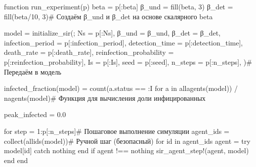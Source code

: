 \documentclass[
  12pt,
  a4paper,
  DIV=11,
  numbers=noendperiod]{scrreprt}
\newenvironment{Shaded}{\begin{snugshade}}{\end{snugshade}}
\newcommand{\CommentTok}[1]{\textcolor[rgb]{0.37,0.37,0.37}{#1}}
\newcommand{\ConstantTok}[1]{\textcolor[rgb]{0.56,0.35,0.01}{#1}}
\newcommand{\ControlFlowTok}[1]{\textcolor[rgb]{0.00,0.23,0.31}{#1}}
\newcommand{\FloatTok}[1]{\textcolor[rgb]{0.68,0.00,0.00}{#1}}
\newcommand{\FunctionTok}[1]{\textcolor[rgb]{0.28,0.35,0.67}{#1}}
\newcommand{\KeywordTok}[1]{\textcolor[rgb]{0.00,0.23,0.31}{#1}}
\newcommand{\NormalTok}[1]{\textcolor[rgb]{0.00,0.23,0.31}{#1}}
\newcommand{\OperatorTok}[1]{\textcolor[rgb]{0.37,0.37,0.37}{#1}}
\begin{document}
\begin{Shaded}
\begin{Highlighting}[]
\KeywordTok{function} \FunctionTok{run\_experiment}\NormalTok{(p)}
\NormalTok{    beta }\OperatorTok{=}\NormalTok{ p[}\OperatorTok{:}\NormalTok{beta]}
\NormalTok{    β\_und }\OperatorTok{=} \FunctionTok{fill}\NormalTok{(beta, }\FloatTok{3}\NormalTok{)}
\NormalTok{    β\_det }\OperatorTok{=} \FunctionTok{fill}\NormalTok{(beta}\OperatorTok{/}\FloatTok{10}\NormalTok{, }\FloatTok{3}\NormalTok{)}\CommentTok{\# Создаём β\_und и β\_det на основе скалярного beta}

\NormalTok{    model }\OperatorTok{=} \FunctionTok{initialize\_sir}\NormalTok{(;}
\NormalTok{        Ns }\OperatorTok{=}\NormalTok{ p[}\OperatorTok{:}\NormalTok{Ns],}
\NormalTok{        β\_und }\OperatorTok{=}\NormalTok{ β\_und,}
\NormalTok{        β\_det }\OperatorTok{=}\NormalTok{ β\_det,}
\NormalTok{        infection\_period }\OperatorTok{=}\NormalTok{ p[}\OperatorTok{:}\NormalTok{infection\_period],}
\NormalTok{        detection\_time }\OperatorTok{=}\NormalTok{ p[}\OperatorTok{:}\NormalTok{detection\_time],}
\NormalTok{        death\_rate }\OperatorTok{=}\NormalTok{ p[}\OperatorTok{:}\NormalTok{death\_rate],}
\NormalTok{        reinfection\_probability }\OperatorTok{=}\NormalTok{ p[}\OperatorTok{:}\NormalTok{reinfection\_probability],}
\NormalTok{        Is }\OperatorTok{=}\NormalTok{ p[}\OperatorTok{:}\NormalTok{Is],}
\NormalTok{        seed }\OperatorTok{=}\NormalTok{ p[}\OperatorTok{:}\NormalTok{seed],}
\NormalTok{        n\_steps }\OperatorTok{=}\NormalTok{ p[}\OperatorTok{:}\NormalTok{n\_steps],}
\NormalTok{    )}\CommentTok{\# Передаём в модель}

    \FunctionTok{infected\_fraction}\NormalTok{(model) }\OperatorTok{=}
        \FunctionTok{count}\NormalTok{(a.status }\OperatorTok{==} \OperatorTok{:}\NormalTok{I }\ControlFlowTok{for}\NormalTok{ a }\KeywordTok{in} \FunctionTok{allagents}\NormalTok{(model)) }\OperatorTok{/} \FunctionTok{nagents}\NormalTok{(model)}\CommentTok{\# Функция для вычисления доли инфицированных}

\NormalTok{    peak\_infected }\OperatorTok{=} \FloatTok{0.0}

    \ControlFlowTok{for}\NormalTok{ step }\OperatorTok{=} \FloatTok{1}\OperatorTok{:}\NormalTok{p[}\OperatorTok{:}\NormalTok{n\_steps]}\CommentTok{\# Пошаговое выполнение симуляции}
\NormalTok{        agent\_ids }\OperatorTok{=} \FunctionTok{collect}\NormalTok{(}\FunctionTok{allids}\NormalTok{(model))}\CommentTok{\# Ручной шаг (безопасный)}
        \ControlFlowTok{for}\NormalTok{ id }\KeywordTok{in}\NormalTok{ agent\_ids}
\NormalTok{            agent }\OperatorTok{=} \ControlFlowTok{try}
\NormalTok{                model[id]}
            \ControlFlowTok{catch}
                \ConstantTok{nothing}
            \ControlFlowTok{end}
            \ControlFlowTok{if}\NormalTok{ agent }\OperatorTok{!==} \ConstantTok{nothing}
                \FunctionTok{sir\_agent\_step!}\NormalTok{(agent, model)}
            \ControlFlowTok{end}
        \ControlFlowTok{end}


\end{Highlighting}
\end{Shaded}
\end{document}
